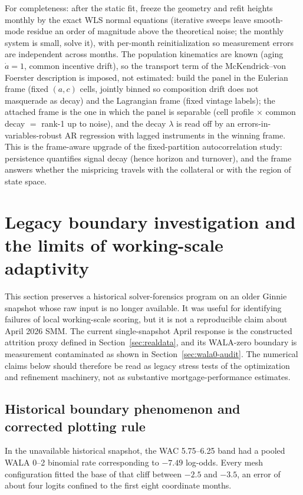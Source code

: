 \documentclass[11pt]{article}
\begin{document}
For completeness: after the static fit, freeze the geometry and refit heights monthly
by the exact WLS normal equations (iterative sweeps leave smooth-mode residue an order
of magnitude above the theoretical noise; the monthly system is small, solve it), with
per-month reinitialization so measurement errors are independent across months. The
population kinematics are known (aging $\dot a=1$, common incentive drift), so the
transport term of the McKendrick--von Foerster description is imposed, not estimated:
build the panel in the Eulerian frame (fixed $(a,c)$ cells, jointly binned so
composition drift does not masquerade as decay) and the Lagrangian frame (fixed vintage
labels); the attached frame is the one in which the panel is separable
(cell profile $\times$ common decay $=$ rank-1 up to noise), and the decay $\lambda$ is
read off by an errors-in-variables-robust AR regression with lagged instruments in the
winning frame. This is the frame-aware upgrade of the fixed-partition autocorrelation
study: persistence quantifies signal decay (hence horizon and turnover), and the frame
answers whether the mispricing travels with the collateral or with the region of state
space.

\section{Legacy boundary investigation and the limits of working-scale adaptivity}\label{sec:boundary}

This section preserves a historical solver-forensics program on an older
Ginnie snapshot whose raw input is no longer available. It was useful for
identifying failures of local working-scale scoring, but it is not a
reproducible claim about April 2026 SMM. The current single-snapshot April
response is the constructed attrition proxy defined in
Section~\ref{sec:realdata}, and its WALA-zero boundary is measurement
contaminated as shown in Section~\ref{sec:wala0-audit}. The numerical claims
below should therefore be read as legacy stress tests of the optimization and
refinement machinery, not as substantive mortgage-performance estimates.

\subsection{Historical boundary phenomenon and corrected plotting rule}

In the unavailable historical snapshot, the WAC 5.75--6.25 band had a pooled
WALA 0--2 binomial rate corresponding to $-7.49$ log-odds. Every mesh
configuration fitted the base of that cliff between $-2.5$ and $-3.5$, an
error of about four logits confined to the first eight coordinate months.
\end{document}

